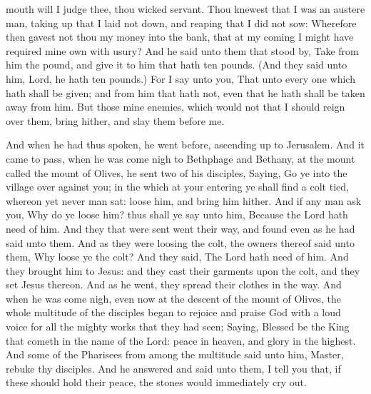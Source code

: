 mouth will I judge thee, thou wicked servant. Thou knewest that I was an
austere man, taking up that I laid not down, and reaping that I did not
sow:  Wherefore then gavest not thou my money into the
bank, that at my coming I might have required mine own with usury?
 And he said unto them that stood by, Take from him the
pound, and give it to him that hath ten pounds.  (And they
said unto him, Lord, he hath ten pounds.)  For I say unto
you, That unto every one which hath shall be given; and from him that
hath not, even that he hath shall be taken away from him. 
But those mine enemies, which would not that I should reign over them,
bring hither, and slay them before me.

 And when he had thus spoken, he went before, ascending
up to Jerusalem.  And it came to pass, when he was come
nigh to Bethphage and Bethany, at the mount called the mount of Olives,
he sent two of his disciples,  Saying, Go ye into the
village over against you; in the which at your entering ye shall find a
colt tied, whereon yet never man sat: loose him, and bring him hither.
 And if any man ask you, Why do ye loose him? thus shall ye
say unto him, Because the Lord hath need of him.  And they
that were sent went their way, and found even as he had said unto them.
 And as they were loosing the colt, the owners thereof said
unto them, Why loose ye the colt?  And they said, The Lord
hath need of him.  And they brought him to Jesus: and they
cast their garments upon the colt, and they set Jesus thereon.
 And as he went, they spread their clothes in the way.
 And when he was come nigh, even now at the descent of the
mount of Olives, the whole multitude of the disciples began to rejoice
and praise God with a loud voice for all the mighty works that they had
seen;  Saying, Blessed be the King that cometh in the name
of the Lord: peace in heaven, and glory in the highest. 
And some of the Pharisees from among the multitude said unto him,
Master, rebuke thy disciples.  And he answered and said
unto them, I tell you that, if these should hold their peace, the stones
would immediately cry out.

